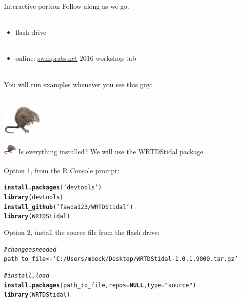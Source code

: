 \documentclass[xcolor=dvipsnames,serif]{beamer}\usepackage[]{graphicx}\usepackage[]{color}
\makeatletter
\newcommand{\hlstr}[1]{\textcolor[rgb]{0.192,0.494,0.8}{#1}}%
\newcommand{\hlcom}[1]{\textcolor[rgb]{0.678,0.584,0.686}{\textit{#1}}}%
\newcommand{\hlstd}[1]{\textcolor[rgb]{0.345,0.345,0.345}{#1}}%
\newcommand{\hlkwa}[1]{\textcolor[rgb]{0.161,0.373,0.58}{\textbf{#1}}}%
\newcommand{\hlkwb}[1]{\textcolor[rgb]{0.69,0.353,0.396}{#1}}%
\newcommand{\hlkwc}[1]{\textcolor[rgb]{0.333,0.667,0.333}{#1}}%
\newcommand{\hlkwd}[1]{\textcolor[rgb]{0.737,0.353,0.396}{\textbf{#1}}}%
\newenvironment{kframe}{%
 \def\at@end@of@kframe{}%
 \ifinner\ifhmode%
  \def\at@end@of@kframe{\end{minipage}}%
  \begin{minipage}{\columnwidth}%
 \fi\fi%
 \def\FrameCommand##1{\hskip\@totalleftmargin \hskip-\fboxsep
 \colorbox{shadecolor}{##1}\hskip-\fboxsep
     \hskip-\linewidth \hskip-\@totalleftmargin \hskip\columnwidth}%
 \MakeFramed {\advance\hsize-\width
   \@totalleftmargin\z@ \linewidth\hsize
   \@setminipage}}%
 {\par\unskip\endMakeFramed%
 \at@end@of@kframe}
\newenvironment{knitrout}{}{} %
\makeatother
\begin{document}
\begin{frame}{Interactive portion}
\onslide<+->
Follow along as we go:\\~\\
\begin{itemize}
\item flash drive\\~\\
\item online: \href{http://swmprats.net/}{swmprats.net} 2016 workshop tab \\~\\
\end{itemize}
\onslide<+->
You will run examples whenever you see this guy: \\~\\
\centerline{\includegraphics[width = 0.15\textwidth]{imgs/swmprat.png}} 
\end{frame}

\begin{frame}[fragile]{\includegraphics[width = 0.05\textwidth]{imgs/swmprat.png} Is everything installed?}
We will use the WRTDStidal package \\~\\
Option 1, from the R Console prompt:
\begin{knitrout}\scriptsize
{}\color{fgcolor}\begin{kframe}
\begin{alltt}
\hlkwd{install.packages}\hlstd{(}\hlstr{'devtools'}\hlstd{)}
\hlkwd{library}\hlstd{(devtools)}
\hlkwd{install_github}\hlstd{(}\hlstr{'fawda123/WRTDStidal'}\hlstd{)}
\hlkwd{library}\hlstd{(WRTDStidal)}
\end{alltt}
\end{kframe}
\end{knitrout}
\vspace{0.1in}
Option 2, install the source file from the flash drive:
\begin{knitrout}\scriptsize
{}\color{fgcolor}\begin{kframe}
\begin{alltt}
\hlcom{# change as needed}
\hlstd{path_to_file} \hlkwb{<-} \hlstr{'C:/Users/mbeck/Desktop/WRTDStidal-1.0.1.9000.tar.gz'}

\hlcom{# install, load}
\hlkwd{install.packages}\hlstd{(path_to_file,} \hlkwc{repos} \hlstd{=} \hlkwa{NULL}\hlstd{,} \hlkwc{type}\hlstd{=}\hlstr{"source"}\hlstd{)}
\hlkwd{library}\hlstd{(WRTDStidal)}
\end{alltt}
\end{kframe}
\end{knitrout}
\end{frame}
\end{document}
